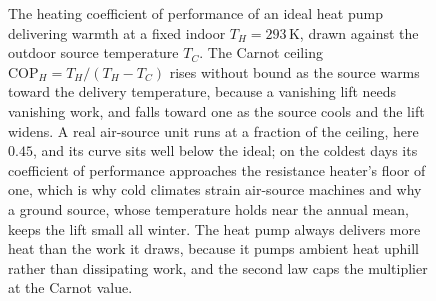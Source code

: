\begin{figure}[htbp]
\centering
{}
\caption[Heating coefficient of performance of a heat pump against source
temperature]{The heating coefficient of performance of an ideal heat pump
delivering warmth at a fixed indoor $T_H=293\,\si{\kelvin}$, drawn against the
outdoor source temperature $T_C$. The Carnot ceiling $\mathrm{COP}_H =
T_H/(T_H-T_C)$ rises without bound as the source warms toward the delivery
temperature, because a vanishing lift needs vanishing work, and falls toward
one as the source cools and the lift widens. A real air-source unit runs at a
fraction of the ceiling, here $0.45$, and its curve sits well below the ideal;
on the coldest days its coefficient of performance approaches the resistance
heater's floor of one, which is why cold climates strain air-source machines
and why a ground source, whose temperature holds near the annual mean, keeps
the lift small all winter. The heat pump always delivers more heat than the
work it draws, because it pumps ambient heat uphill rather than dissipating
work, and the second law caps the multiplier at the Carnot value.}
\label{fig:vol04ch04:heatpump-cop}
\end{figure}
